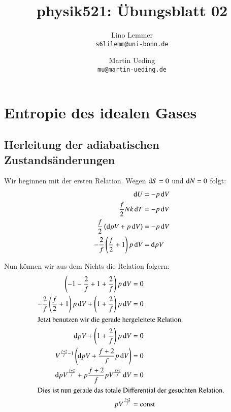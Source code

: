

\setcounter{section}{1}
\renewcommand\thesection{H\,2.\arabic{section}}
\renewcommand\thesubsection{\thesection.\alph{subsection}}

\title{physik521: Übungsblatt 02}
\author{%
    Lino Lemmer \\ \small{\texttt{s6lilemm@uni-bonn.de}}
    \and
    Martin Ueding \\ \small{\texttt{mu@martin-ueding.de}}
}


\maketitle
\section{Entropie des idealen Gases}

\subsection{Herleitung der adiabatischen Zustandsänderungen}

Wir beginnen mit der ersten Relation. Wegen $\dif S = 0$ und $\dif N = 0$ folgt:
\begin{align*}
    \dif U &= - p \dif V \\
    \frac f2 N k \dif T &= - p \dif V \\
    \frac f2 \left( \dif p V + p \dif V \right) &= - p \dif V \\
        - \frac 2f \left( \frac f2 + 1 \right) p \dif V &= \dif p V
\end{align*}

Nun können wir aus dem Nichts die Relation folgern:
\begin{align*}
    \left( -1 - \frac 2f + 1 + \frac 2f \right) p \dif V &= 0 \\
    - \frac 2f \left( \frac f2 + 1 \right) p \dif V + \left( 1 + \frac 2f \right) p \dif V &= 0 \\
    \intertext{%
        Jetzt benutzen wir die gerade hergeleitete Relation.
    }
    \dif p V + \left( 1 + \frac 2f \right) p \dif V &= 0 \\
    V^{\frac{f+2}f -1} \left( \dif p V + \frac{f+2}f p \dif V \right) &= 0 \\
    \dif p V^{\frac{f+2}f} + p \frac{f+2}f p V^{\frac{f+2}f} \dif V &= 0 \\
    \intertext{%
        Dies ist nun gerade das totale Differential der
        gesuchten Relation.
    }
    p V^{\frac{f+2}f} &= \text{const}
\end{align*}

